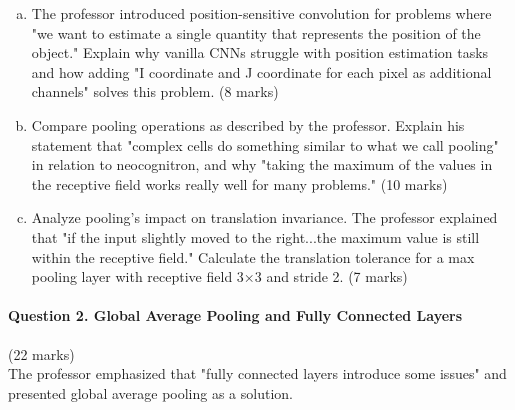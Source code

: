 \documentclass[12pt]{article}
\newcommand{\shortanswer}{\vspace{2cm}}
\newcommand{\mediumanswer}{\vspace{3cm}}
\begin{document}
\begin{enumerate}[(a)]
    \item The professor introduced position-sensitive convolution for problems where "we want to estimate a single quantity that represents the position of the object." Explain why vanilla CNNs struggle with position estimation tasks and how adding "I coordinate and J coordinate for each pixel as additional channels" solves this problem. \hfill (8 marks)
    
    \mediumanswer
    
    \item Compare pooling operations as described by the professor. Explain his statement that "complex cells do something similar to what we call pooling" in relation to neocognitron, and why "taking the maximum of the values in the receptive field works really well for many problems." \hfill (10 marks)
    
    \mediumanswer
    
    \item Analyze pooling's impact on translation invariance. The professor explained that "if the input slightly moved to the right...the maximum value is still within the receptive field." Calculate the translation tolerance for a max pooling layer with receptive field 3×3 and stride 2. \hfill (7 marks)
    
    \shortanswer
\end{enumerate}

\newpage
\paragraph{Question 2. Global Average Pooling and Fully Connected Layers}{\hfill (22 marks)}\\
The professor emphasized that "fully connected layers introduce some issues" and presented global average pooling as a solution.
\end{document}
